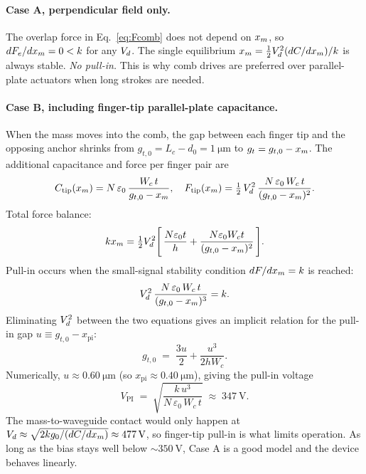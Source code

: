 \paragraph{Case A, perpendicular field only.}
The overlap force in Eq.~\ref{eq:Fcomb} does not depend on $x_{m}$, so
$dF_{e}/dx_{m} = 0 < k$ for any $V_{d}$. The single equilibrium
$x_{m} = \tfrac{1}{2}V_{d}^{2}(dC/dx_{m})/k$ is always stable. \emph{No pull-in.}
This is why comb drives are preferred over parallel-plate actuators when long
strokes are needed.

\paragraph{Case B, including finger-tip parallel-plate capacitance.}
When the mass moves into the comb, the gap between each finger tip and the
opposing anchor shrinks from $g_{t,0}=L_{c}-d_{0}=\SI{1}{\micro\meter}$ to
$g_{t}=g_{t,0}-x_{m}$. The additional capacitance and force per finger pair are
\begin{equation}
  C_{\mathrm{tip}}(x_{m}) = N\,\varepsilon_{0}\,\frac{W_{c}\,t}{g_{t,0}-x_{m}},
  \quad
  F_{\mathrm{tip}}(x_{m}) = \tfrac{1}{2}\,V_{d}^{2}\,
                          \frac{N\,\varepsilon_{0}\,W_{c}\,t}{(g_{t,0}-x_{m})^{2}}.
\end{equation}
Total force balance:
\begin{equation}
  kx_{m} = \tfrac{1}{2}V_{d}^{2}\Biggl[\,
         \frac{N\varepsilon_{0}t}{h}
         + \frac{N\varepsilon_{0}W_{c}t}{(g_{t,0}-x_{m})^{2}}\,\Biggr].
\end{equation}
Pull-in occurs when the small-signal stability condition $dF/dx_{m} = k$ is
reached:
\begin{equation}
  V_{d}^{2}\,\frac{N\,\varepsilon_{0}\,W_{c}\,t}{(g_{t,0}-x_{m})^{3}} = k.
\end{equation}
Eliminating $V_{d}^{2}$ between the two equations gives an implicit relation
for the pull-in gap $u\equiv g_{t,0}-x_{\mathrm{pi}}$:
\begin{equation}
  g_{t,0} \;=\; \frac{3u}{2} + \frac{u^{3}}{2 h W_{c}}.
\end{equation}
Numerically, $u\approx\SI{0.60}{\micro\meter}$ (so
$x_{\mathrm{pi}}\approx\SI{0.40}{\micro\meter}$), giving the pull-in voltage
\begin{equation}
  V_{\mathrm{PI}} \;=\; \sqrt{\frac{k\,u^{3}}{N\,\varepsilon_{0}\,W_{c}\,t}}
                  \;\approx\; \SI{347}{\volt}.
\end{equation}
The mass-to-waveguide contact would only happen at
$V_{d} \approx \sqrt{2 k g_{0}/(dC/dx_{m})} \approx \SI{477}{\volt}$, so finger-tip
pull-in is what limits operation. As long as the bias stays well below
$\sim\!\SI{350}{\volt}$, Case A is a good model and the device behaves linearly.
